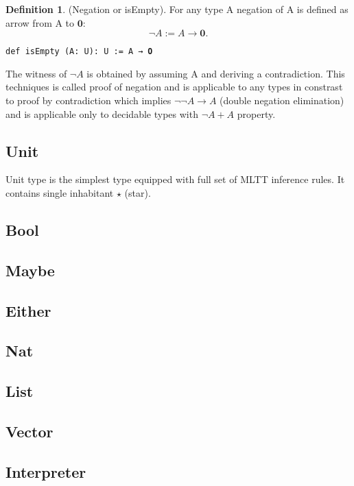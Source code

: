 \documentclass{article}
\theoremstyle{definition}
\newtheorem{definition}{Definition}
\begin{document}
\begin{definition} (Negation or isEmpty).
For any type A negation of A is defined as arrow from A to $\mathbf{0}$:
$$
  \neg A := A \rightarrow \mathbf{0}.
$$
\begin{lstlisting}
def isEmpty (A: U): U := A → 𝟎
\end{lstlisting}
\end{definition}

The witness of $\neg A$ is obtained by assuming A and deriving a contradiction.
This techniques is called proof of negation and is applicable to any types in constrast
to proof by contradiction which implies $\neg\neg A \rightarrow A$ (double negation elimination) and is
applicable only to decidable types with $\neg A + A$ property.

\newpage
\subsection{Unit}
Unit type is the simplest type equipped with full set of MLTT inference rules. It contains single inhabitant $\star$ (star).

\newpage
\subsection{Bool}

\subsection{Maybe}

\subsection{Either}

\subsection{Nat}

\subsection{List}

\subsection{Vector}

\subsection{Interpreter}
\end{document}
